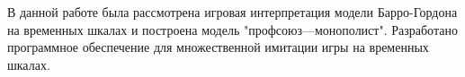 В данной работе была рассмотрена игровая интерпретация модели Барро-Гордона на временных шкалах и построена модель "профсоюз---монополист". Разработано  программное обеспечение для множественной имитации игры на временных шкалах.  